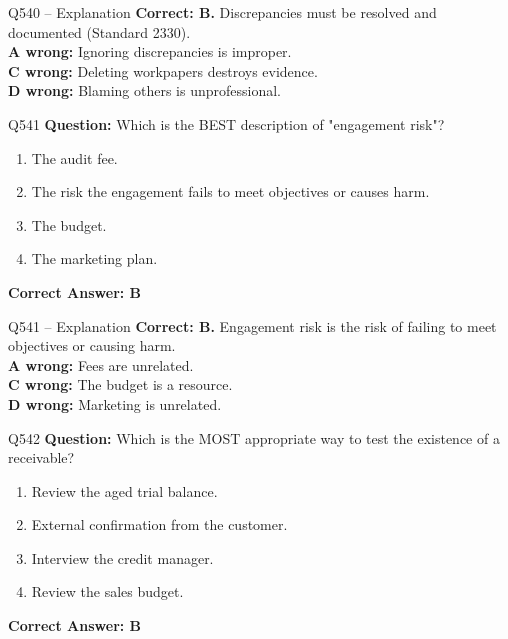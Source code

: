 \documentclass[aspectratio=169,10pt]{beamer}
\begin{document}
	\begin{frame}[t]{Q540 -- Explanation}
		\small
		\textbf{Correct: B.} Discrepancies must be resolved and documented (Standard 2330). \\[4pt]
		\textbf{A wrong:} Ignoring discrepancies is improper. \\[2pt]
		\textbf{C wrong:} Deleting workpapers destroys evidence. \\[2pt]
		\textbf{D wrong:} Blaming others is unprofessional.
	\end{frame}
	
	\begin{frame}[t]{Q541}
		\small
		\textbf{Question:} Which is the BEST description of "engagement risk"?
		\begin{enumerate}[label=\Alph*.,itemsep=1pt,topsep=2pt]
			\item The audit fee.
			\item The risk the engagement fails to meet objectives or causes harm.
			\item The budget.
			\item The marketing plan.
		\end{enumerate}
		\vspace{4pt}
		\textbf{Correct Answer: B}
	\end{frame}
	
	\begin{frame}[t]{Q541 -- Explanation}
		\small
		\textbf{Correct: B.} Engagement risk is the risk of failing to meet objectives or causing harm. \\[4pt]
		\textbf{A wrong:} Fees are unrelated. \\[2pt]
		\textbf{C wrong:} The budget is a resource. \\[2pt]
		\textbf{D wrong:} Marketing is unrelated.
	\end{frame}
	
	\begin{frame}[t]{Q542}
		\small
		\textbf{Question:} Which is the MOST appropriate way to test the existence of a receivable?
		\begin{enumerate}[label=\Alph*.,itemsep=1pt,topsep=2pt]
			\item Review the aged trial balance.
			\item External confirmation from the customer.
			\item Interview the credit manager.
			\item Review the sales budget.
		\end{enumerate}
		\vspace{4pt}
		\textbf{Correct Answer: B}
	\end{frame}
	
\end{document}
